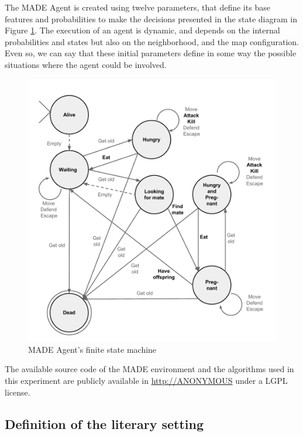 \documentclass{sig-alternate}
\begin{document}
The MADE Agent is created using twelve parameters, that define its
base features and probabilities to make the decisions presented in the
state diagram in Figure \ref{fig:fsm}. The execution of an
agent is dynamic, and depends on the internal probabilities and states
but also on the neighborhood, and the map configuration. Even so, we
can say that these initial parameters define in some way the possible
situations where the agent could be involved.

\begin{figure}
\begin{center}
\includegraphics[scale=0.35]{img/fsm.pdf}
\caption{MADE Agent's finite state machine}
\label{fig:fsm}
\end{center}
\end{figure}



The available source code of the MADE environment and the algorithms used in this experiment are publicly available in \url{http://ANONYMOUS} under a LGPL license.

\subsection{Definition of the literary setting}
\end{document}
